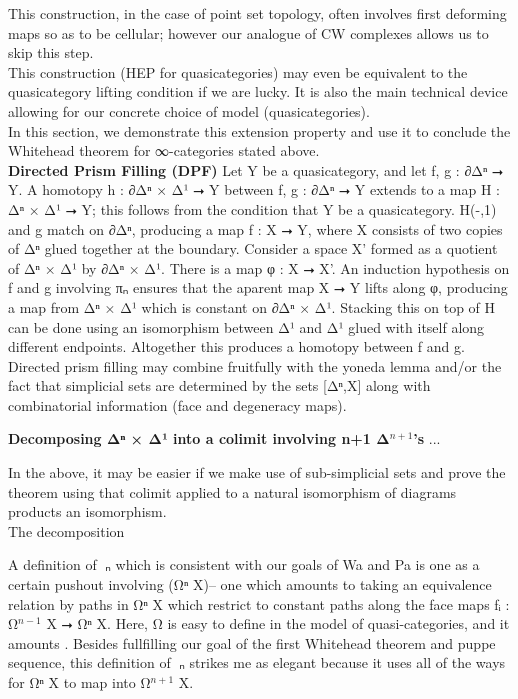 \documentclass{book}
\theoremstyle{definition}
\begin{document}
This construction, in the case of point set topology, often involves first deforming maps so as to be cellular; however our analogue of CW complexes allows us to skip this step.\\

This construction (HEP for quasicategories) may even be equivalent to the quasicategory lifting condition if we are lucky. It is also the main technical device allowing for our concrete choice of model (quasicategories).\\

In this section, we demonstrate this extension property and use it to conclude the Whitehead theorem for ∞-categories stated above.\\

{\bf Directed Prism Filling (DPF)} Let Y be a quasicategory, and let f, g : ∂Δⁿ ⭢ Y. A homotopy h : ∂Δⁿ × Δ¹ ⭢ Y between f, g : ∂Δⁿ ⭢ Y extends to a map H : Δⁿ × Δ¹ ⭢ Y; this follows from the condition that Y be a quasicategory. H(-,1) and g match on ∂Δⁿ, producing a map f : X ⭢ Y, where X consists of two copies of Δⁿ glued together at the boundary. Consider a space X' formed as a quotient of Δⁿ × Δ¹ by ∂Δⁿ × Δ¹. There is a map φ : X ⭢ X'. An induction hypothesis on f and g involving πₙ ensures that the aparent map X ⭢ Y lifts along φ, producing a map from Δⁿ × Δ¹ which is constant on ∂Δⁿ × Δ¹. Stacking this on top of H can be done using an isomorphism between Δ¹ and Δ¹ glued with itself along different endpoints. Altogether this produces a homotopy between f and g.\\

Directed prism filling may combine fruitfully with the yoneda lemma and/or the fact that simplicial sets are determined by the sets [Δⁿ,X] along with combinatorial information (face and degeneracy maps).

{\bf Decomposing Δⁿ × Δ¹ into a colimit involving n+1 Δ${}^{n+1}$'s} ...


In the above, it may be easier if we make use of sub-simplicial sets and prove the theorem using that colimit applied to a natural isomorphism of diagrams products an isomorphism.\\

The decomposition 

A definition of π⃗ₙ which is consistent with our goals of Wa and Pa is one as a certain pushout involving (Ω⃗ⁿ X)-- one which amounts to taking an equivalence relation by paths in Ω⃗ⁿ X which restrict to constant paths along the face maps fᵢ : Ω⃗${}^{n-1}$ X ⭢ Ω⃗ⁿ X. Here, Ω⃗ is easy to define in the model of quasi-categories, and it amounts . Besides fullfilling our goal of the first Whitehead theorem and puppe sequence, this definition of π⃗ₙ strikes me as elegant because it uses all of the ways for Ω⃗ⁿ X to map into Ω⃗${}^{n+1}$ X.\\
\end{document}
